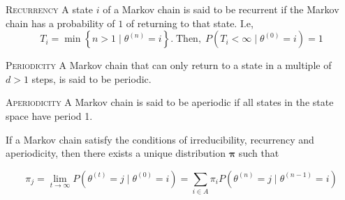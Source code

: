 \theoremstyle{definition} 
\begin{definition}{\textsc{Recurrency}}
A state $i$ of a Markov chain is said to be recurrent if the Markov chain has a probability of $1$ of returning to that state.  I.e, $$T_i = \min\left\{ n > 1 \mid \theta^{\left(n\right)} = i\right\}.\;\text{Then}, \; P\left(T_i < \infty\mid \theta^{\left(0\right)} = i\right) = 1$$
\end{definition}
\begin{definition}{\textsc{Periodicity}} 
A Markov chain that can only return to a state in a multiple of $d>1$ steps, is said to be periodic. 
\end{definition}
\theoremstyle{definition}
\begin{definition}{\textsc{Aperiodicity}}
A Markov chain is said to be aperiodic if all states in the state space have period 1. 
\end{definition}
If a Markov chain satisfy the conditions of irreducibility, recurrency and aperiodicity, then there exists a unique  distribution $\mathbf{\pi}$ such that

\begin{equation*}
    \pi_j = \lim_{t\rightarrow{}\infty} P\left(\theta^{\left(t\right)} = j \mid \theta^{\left(0\right)} = i \right) =  \sum_{i \in A} \pi_i P\left(\theta^{\left(n\right)} = j \mid \theta^{\left(n-1\right)} = i\right)
\end{equation*}
